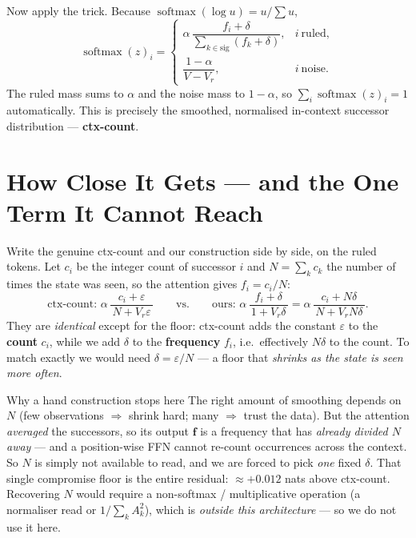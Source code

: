\documentclass[11pt]{article}
\newcommand{\fvec}{\mathbf{f}}
\newcommand{\sm}{\operatorname{softmax}}
\begin{document}
Now apply the trick. Because $\sm(\log u)=u/\sum u$,
$$
\boxed{\;
\sm(z)_i=
\begin{cases}
\alpha\,\dfrac{f_i+\delta}{\sum_{k\in\text{sig}}(f_k+\delta)}, & i\ \text{ruled},\\[10pt]
\dfrac{1-\alpha}{V-V_r}, & i\ \text{noise}.
\end{cases}\;}
$$
The ruled mass sums to $\alpha$ and the noise mass to $1-\alpha$, so $\sum_i\sm(z)_i=1$ automatically.
This is precisely the smoothed, normalised in-context successor distribution --- \textbf{ctx-count}.

\section{How Close It Gets --- and the One Term It Cannot Reach}
Write the genuine ctx-count and our construction side by side, on the ruled tokens. Let $c_i$ be the
integer count of successor $i$ and $N=\sum_k c_k$ the number of times the state was seen, so the attention
gives $f_i=c_i/N$:
$$
\text{ctx-count: } \alpha\,\frac{c_i+\varepsilon}{\,N+V_r\varepsilon\,}
\qquad\text{vs.}\qquad
\text{ours: } \alpha\,\frac{f_i+\delta}{\,1+V_r\delta\,}
=\alpha\,\frac{c_i+N\delta}{\,N+V_r N\delta\,}.
$$
They are \emph{identical} except for the floor: ctx-count adds the constant $\varepsilon$ to the
\textbf{count} $c_i$, while we add $\delta$ to the \textbf{frequency} $f_i$, i.e.\ effectively $N\delta$ to
the count. To match exactly we would need $\delta=\varepsilon/N$ --- a floor that \emph{shrinks as the
state is seen more often}.

\begin{invbox}{Why a hand construction stops here}
The right amount of smoothing depends on $N$ (few observations $\Rightarrow$ shrink hard; many
$\Rightarrow$ trust the data). But the attention \emph{averaged} the successors, so its output $\fvec$ is a
frequency that has \emph{already divided $N$ away} --- and a position-wise FFN cannot re-count occurrences
across the context. So $N$ is simply not available to read, and we are forced to pick \emph{one} fixed
$\delta$. That single compromise floor is the entire residual: $\approx +0.012$ nats above ctx-count.
Recovering $N$ would require a non-softmax / multiplicative operation (a normaliser read or
$1/\!\sum_k A_k^2$), which is \emph{outside this architecture} --- so we do not use it here.
\end{invbox}
\end{document}
